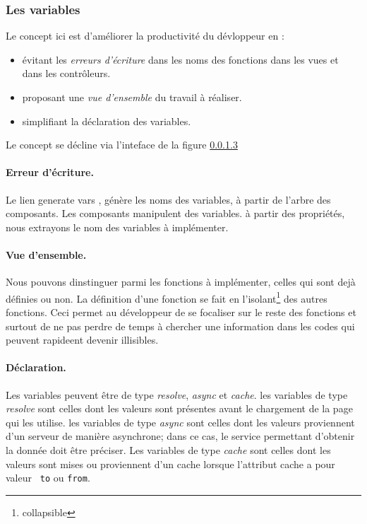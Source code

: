 \documentclass[a4paper,12pt]{article}
\begin{document}
\subsubsection{Les variables}
Le concept ici est d'améliorer la productivité du dévloppeur en :
\begin{itemize}
\item évitant les {\em erreurs d'écriture} dans les noms des
fonctions dans les vues et dans les contrôleurs.
\item proposant une {\em vue d'ensemble} du travail à réaliser.
\item simplifiant la déclaration des variables.

\end{itemize}

Le concept se décline via l'inteface de la figure \ref{}

\paragraph{Erreur d'écriture.}
Le lien \og generate vars \fg, génère les noms des variables, à partir
de l'arbre des composants. Les composants manipulent des variables. à
partir des propriétés, nous extrayons
le nom des variables à implémenter.

\paragraph{Vue d'ensemble.}
Nous pouvons dinstinguer parmi les fonctions à implémenter, celles qui
sont dejà définies ou non. La définition d'une fonction se fait en
l'isolant\footnote{collapsible} des autres fonctions. Ceci permet au
développeur de se focaliser sur le reste des fonctions et surtout de
ne pas perdre de temps à chercher une information dans les codes qui
peuvent rapideent devenir illisibles.

\paragraph{Déclaration.}
Les variables peuvent être de type {\em resolve}, {\em async} et {\em
  cache}.  les variables de type {\em resolve} sont celles dont les
valeurs sont présentes avant le chargement de la page qui les utilise.
les variables de type {\em async} sont celles dont les valeurs
proviennent d'un serveur de manière asynchrone; dans ce cas, le
service permettant d'obtenir la donnée doit être préciser.  Les
variables de type {\em cache} sont celles dont les valeurs sont mises
ou proviennent d'un cache lorsque l'attribut cache a pour valeur {\tt
  to} ou  {\tt from}.
\end{document}
